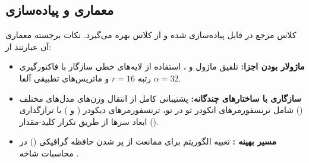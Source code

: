\subsection{معماری و پیاده‌سازی}
کلاس مرجع  در فایل  پیاده‌سازی شده و از کلاس  بهره می‌گیرد. نکات برجسته معماری آن عبارتند از:
\begin{itemize}
    \item \textbf{ماژولار بودن اجزا:} تلفیق ماژول  و ، استفاده از لایه‌های خطی سازگار  با فاکتورگیری رتبه $r=16$ و ماتریس‌های تطبیقی آلفا $\alpha=32$.
    \item \textbf{سازگاری با ساختارهای چندگانه:} پشتیبانی کامل از انتقال وزن‌های مدل‌های مختلف () شامل ترنسفورمرهای انکودر تو در تو، ترنسفورمرهای دیکودر ( و ) با ترازگذاری ابعاد سرها از طریق تکرار کلید-مقدار ().
    \item \textbf{مسیر بهینه :} تعبیه الگوریتم  برای ممانعت از پر شدن حافظه گرافیکی () در محاسبات شاخه .
\end{itemize}
